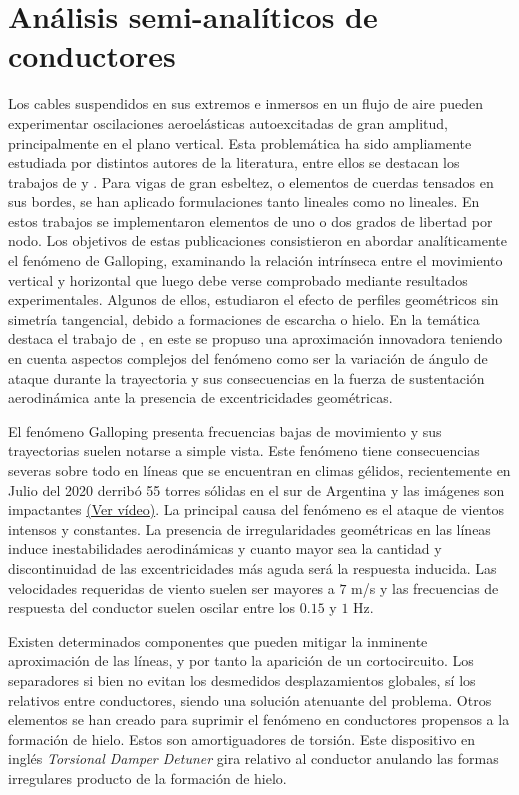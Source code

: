 \section{Análisis semi-analíticos de conductores}\label{Sec:EA:Galloping}

Los cables suspendidos en sus extremos e inmersos en un flujo de aire pueden experimentar oscilaciones aeroelásticas autoexcitadas de gran amplitud, principalmente en el plano vertical. Esta problemática ha sido ampliamente estudiada por distintos autores de la literatura, entre ellos se destacan los trabajos de \cite{blevins1990van} y \cite{jones1992coupled}. Para vigas de gran esbeltez, o elementos de cuerdas tensados en sus bordes, se han aplicado formulaciones tanto lineales como no lineales.  En estos trabajos se implementaron elementos de uno o dos grados de libertad por nodo. Los objetivos de estas publicaciones consistieron en abordar analíticamente el fenómeno de Galloping, examinando la relación intrínseca entre el movimiento vertical y horizontal que luego debe verse comprobado mediante resultados experimentales. Algunos de ellos, estudiaron el efecto de perfiles geométricos sin simetría tangencial, debido a formaciones de escarcha o hielo. En la temática destaca el trabajo de \cite{chabart1998galloping}, en este se propuso una aproximación innovadora teniendo en cuenta aspectos complejos del fenómeno como ser la variación de ángulo de ataque durante la trayectoria y sus consecuencias en la fuerza de sustentación aerodinámica ante la presencia de excentricidades geométricas. 

El fenómeno Galloping presenta frecuencias bajas de movimiento y sus trayectorias suelen notarse a simple vista. Este fenómeno tiene consecuencias severas sobre todo en líneas que se encuentran en climas gélidos, recientemente en Julio del 2020 derribó 55 torres sólidas en el sur de Argentina y las imágenes son impactantes \href{blob:https://www.clarin.com/df740f0f-cd9a-4b9a-8c55-c594c9ea262c}{(Ver vídeo)}. La principal causa del fenómeno es el ataque de vientos intensos y constantes. La presencia de irregularidades geométricas en las líneas induce inestabilidades aerodinámicas y cuanto mayor sea la cantidad y discontinuidad de las excentricidades más aguda será la respuesta inducida. Las velocidades requeridas de viento suelen ser mayores a $7$ m/s y las frecuencias de respuesta del conductor suelen oscilar entre los $ 0.15$ y $1$ Hz.

Existen determinados componentes que pueden mitigar la inminente aproximación de las líneas, y por tanto la aparición de un cortocircuito. Los separadores si bien no evitan los desmedidos desplazamientos globales, sí los relativos entre conductores, siendo una solución atenuante del problema. Otros elementos se han creado para suprimir el fenómeno en conductores propensos a la formación de hielo. Estos son amortiguadores de torsión. Este dispositivo en inglés \textit{Torsional Damper Detuner} gira relativo al conductor anulando las formas irregulares producto de la formación de hielo.  

